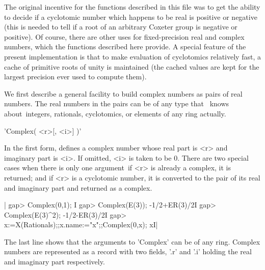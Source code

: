 

The original incentive for the functions  described in this file was to
get the  ability to decide if  a cyclotomic number which  happens to be
real is positive  or negative (this is  needed to tell if a  root of an
arbitrary Coxeter group is negative  or positive). Of course, there are
other  uses for  fixed-precision real  and complex  numbers, which  the
functions  described here  provide. A  special feature  of the  present
implementation  is that  to make  evaluation of  cyclotomics relatively
fast, a  cache of primitive  roots of  unity is maintained  (the cached
values are kept for the largest precision ever used to compute them).

We first describe a general facility  to build complex numbers as pairs
of real numbers. The real numbers in  the pairs can be of any type that
\GAP\ knows  about\:\ integers, rationals, cyclotomics,  or elements of
any ring actually.

%
%

'Complex( <r>[, <i>] )'

In the first form, defines a complex  number whose real part is <r> and
imaginary part is <i>. If omitted, <i>  is taken to be 0. There are two
special cases  when there is only  one argument\:\ if <r>  is already a
complex,  it is  returned; and  if <r>  is a  cyclotomic number,  it is
converted to the pair of its real  and imaginary part and returned as a
complex.

|    gap> Complex(0,1);
    I
    gap> Complex(E(3));
    -1/2+ER(3)/2I
    gap> Complex(E(3)^2);
    -1/2-ER(3)/2I
    gap> x:=X(Rationals);;x.name:="x";;Complex(0,x);
    xI|

The last line shows that the arguments to 'Complex' can be of any ring.
Complex numbers are  represented as a record with two  fields, '.r' and
'.i' holding the real and imaginary part respectively.


